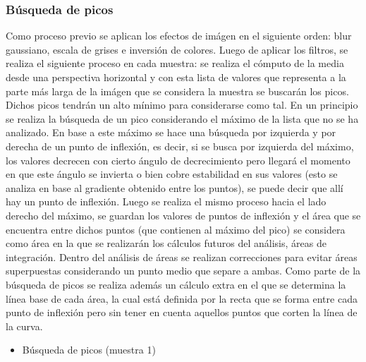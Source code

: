 \subsubsection{B\'usqueda de picos}
Como proceso previo se aplican los efectos de im\'agen en el siguiente orden: blur gaussiano, escala de grises e inversi\'on de colores. Luego de aplicar los filtros, se realiza el siguiente proceso en cada muestra: se realiza el c\'omputo de la media desde una perspectiva horizontal y con esta lista de valores que representa  a la parte m\'as larga de la im\'agen que se considera la muestra se buscar\'an los picos. Dichos picos tendr\'an un alto m\'inimo para considerarse como tal. En un principio se realiza la b\'usqueda de un pico considerando el m\'aximo de la lista que no se ha analizado. En base a este m\'aximo se hace una b\'usqueda por izquierda y por derecha de un punto de inflexi\'on, es decir, si se busca por izquierda del m\'aximo, los valores decrecen con cierto \'angulo de decrecimiento pero llegar\'a el momento en que este \'angulo se invierta o bien cobre estabilidad en sus valores (esto se analiza en base al gradiente obtenido entre los puntos), se puede decir que all\'i hay un punto de inflexi\'on. Luego se realiza el mismo proceso hacia el lado derecho del m\'aximo, se guardan los valores de puntos de inflexi\'on y el \'area que se encuentra entre dichos puntos (que contienen al m\'aximo del pico) se considera como \'area en la que se realizar\'an los c\'alculos futuros del an\'alisis, \'areas de integraci\'on. Dentro del an\'alisis de \'areas se realizan correcciones para evitar \'areas superpuestas considerando un punto medio que separe a ambas.
Como parte de la b\'usqueda de picos se realiza adem\'as un c\'alculo extra en el que se determina la l\'inea base de cada \'area, la cual est\'a definida por la recta que se forma entre cada punto de inflexi\'on pero sin tener en cuenta aquellos puntos que corten la l\'inea de la curva.

\begin{itemize}
	\item B\'usqueda de picos (muestra 1)
\end{itemize}
\vspace{-0.5cm}

